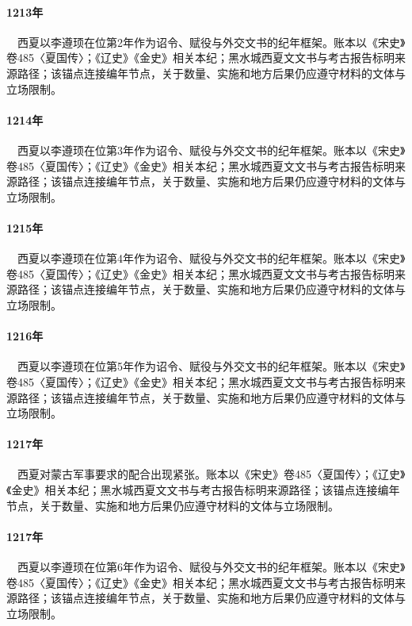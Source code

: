 \paragraph{1213年}　西夏以李遵顼在位第2年作为诏令、赋役与外交文书的纪年框架。账本以《宋史》卷485〈夏国传〉；《辽史》《金史》相关本纪；黑水城西夏文文书与考古报告标明来源路径；该锚点连接编年节点，关于数量、实施和地方后果仍应遵守材料的文体与立场限制。

\paragraph{1214年}　西夏以李遵顼在位第3年作为诏令、赋役与外交文书的纪年框架。账本以《宋史》卷485〈夏国传〉；《辽史》《金史》相关本纪；黑水城西夏文文书与考古报告标明来源路径；该锚点连接编年节点，关于数量、实施和地方后果仍应遵守材料的文体与立场限制。

\paragraph{1215年}　西夏以李遵顼在位第4年作为诏令、赋役与外交文书的纪年框架。账本以《宋史》卷485〈夏国传〉；《辽史》《金史》相关本纪；黑水城西夏文文书与考古报告标明来源路径；该锚点连接编年节点，关于数量、实施和地方后果仍应遵守材料的文体与立场限制。

\paragraph{1216年}　西夏以李遵顼在位第5年作为诏令、赋役与外交文书的纪年框架。账本以《宋史》卷485〈夏国传〉；《辽史》《金史》相关本纪；黑水城西夏文文书与考古报告标明来源路径；该锚点连接编年节点，关于数量、实施和地方后果仍应遵守材料的文体与立场限制。

\paragraph{1217年}　西夏对蒙古军事要求的配合出现紧张。账本以《宋史》卷485〈夏国传〉；《辽史》《金史》相关本纪；黑水城西夏文文书与考古报告标明来源路径；该锚点连接编年节点，关于数量、实施和地方后果仍应遵守材料的文体与立场限制。

\paragraph{1217年}　西夏以李遵顼在位第6年作为诏令、赋役与外交文书的纪年框架。账本以《宋史》卷485〈夏国传〉；《辽史》《金史》相关本纪；黑水城西夏文文书与考古报告标明来源路径；该锚点连接编年节点，关于数量、实施和地方后果仍应遵守材料的文体与立场限制。

